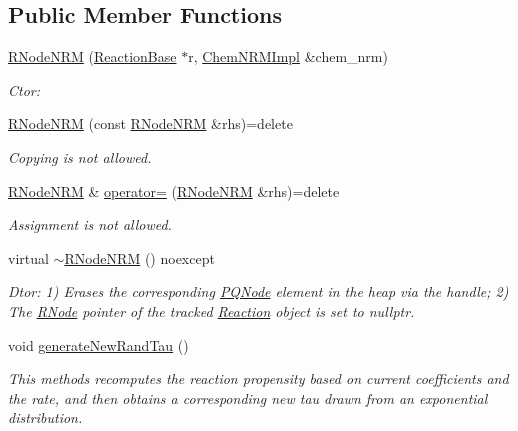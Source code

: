 \subsection*{Public Member Functions}
\begin{DoxyCompactItemize}
\item 
\hyperlink{classRNodeNRM_abcdcce52b4bbf2fe03916aee59da4695}{R\+Node\+N\+R\+M} (\hyperlink{classReactionBase}{Reaction\+Base} $\ast$r, \hyperlink{classChemNRMImpl}{Chem\+N\+R\+M\+Impl} \&chem\+\_\+nrm)
\begin{DoxyCompactList}\small\item\em Ctor\+: \end{DoxyCompactList}\item 
\hyperlink{classRNodeNRM_a5e23c02ae145776cc30c3b2d3db00b7d}{R\+Node\+N\+R\+M} (const \hyperlink{classRNodeNRM}{R\+Node\+N\+R\+M} \&rhs)=delete
\begin{DoxyCompactList}\small\item\em Copying is not allowed. \end{DoxyCompactList}\item 
\hyperlink{classRNodeNRM}{R\+Node\+N\+R\+M} \& \hyperlink{classRNodeNRM_a09dfd7a16917e53dab4cbef672e3b458}{operator=} (\hyperlink{classRNodeNRM}{R\+Node\+N\+R\+M} \&rhs)=delete
\begin{DoxyCompactList}\small\item\em Assignment is not allowed. \end{DoxyCompactList}\item 
virtual \hyperlink{classRNodeNRM_abbc24167cddde84ef4b8ea5407ed1fbe}{$\sim$\+R\+Node\+N\+R\+M} () noexcept
\begin{DoxyCompactList}\small\item\em Dtor\+: 1) Erases the corresponding \hyperlink{classPQNode}{P\+Q\+Node} element in the heap via the handle; 2) The \hyperlink{classRNode}{R\+Node} pointer of the tracked \hyperlink{classReaction}{Reaction} object is set to nullptr. \end{DoxyCompactList}\item 
void \hyperlink{classRNodeNRM_a7067410e41c97db4e5b49f2f4ff68fb1}{generate\+New\+Rand\+Tau} ()
\begin{DoxyCompactList}\small\item\em This methods recomputes the reaction propensity based on current coefficients and the rate, and then obtains a corresponding new tau drawn from an exponential distribution. \end{DoxyCompactList}\item 

\end{DoxyCompactItemize}
